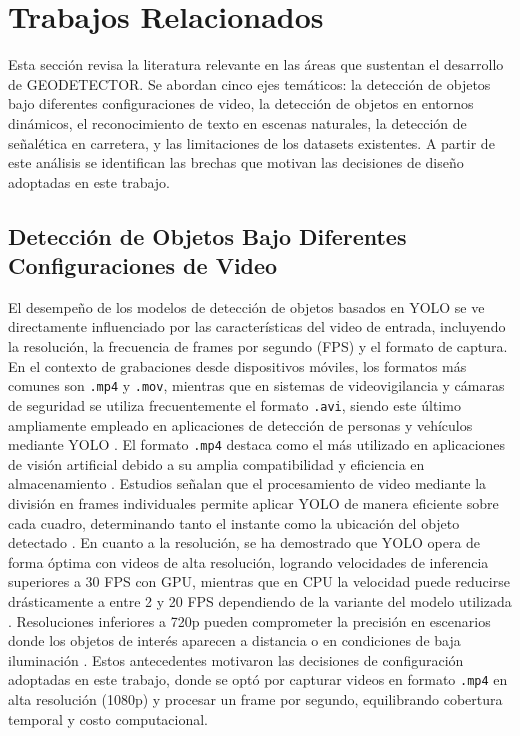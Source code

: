 \documentclass[runningheads]{llncs}
\begin{document}
\section{Trabajos Relacionados}
Esta sección revisa la literatura relevante en las áreas que sustentan el
 desarrollo de GEODETECTOR.
Se abordan cinco ejes temáticos: la detección de objetos bajo diferentes 
configuraciones de video, la detección de objetos en entornos dinámicos, 
el reconocimiento de texto en escenas naturales, 
la detección de señalética en carretera, y las limitaciones de los datasets existentes. A partir de este análisis se identifican las brechas 
que motivan las decisiones de diseño adoptadas en este trabajo.

\subsection{Detección de Objetos Bajo Diferentes Configuraciones de Video}
El desempeño de los modelos de detección de objetos basados en YOLO 
se ve directamente influenciado por las características del video de 
entrada, incluyendo la resolución, la frecuencia de frames por segundo 
(FPS) y el formato de captura. En el contexto de grabaciones desde 
dispositivos móviles, los formatos más comunes son \texttt{.mp4} y 
\texttt{.mov}, mientras que en sistemas de videovigilancia y cámaras 
de seguridad se utiliza frecuentemente el formato \texttt{.avi}, siendo 
este último ampliamente empleado en aplicaciones de detección de 
personas y vehículos mediante YOLO \cite{yolo-mp4-frames}. El formato 
\texttt{.mp4} destaca como el más utilizado en aplicaciones de visión 
artificial debido a su amplia compatibilidad y eficiencia en 
almacenamiento \cite{yolo-mp4-frames}. Estudios señalan que el 
procesamiento de video mediante la división en frames individuales 
permite aplicar YOLO de manera eficiente sobre cada cuadro, 
determinando tanto el instante como la ubicación del objeto detectado 
\cite{yolo-mp4-frames}. En cuanto a la resolución, se ha demostrado 
que YOLO opera de forma óptima con videos de alta resolución, logrando 
velocidades de inferencia superiores a 30 FPS con GPU, mientras que en 
CPU la velocidad puede reducirse drásticamente a entre 2 y 20 FPS 
dependiendo de la variante del modelo utilizada 
\cite{yolo-traffic-resolution}. Resoluciones inferiores a 720p pueden 
comprometer la precisión en escenarios donde los objetos de interés 
aparecen a distancia o en condiciones de baja iluminación 
\cite{yolo-traffic-resolution}. Estos antecedentes motivaron las 
decisiones de configuración adoptadas en este trabajo, donde se optó 
por capturar videos en formato \texttt{.mp4} en alta resolución (1080p)
y procesar un frame por segundo, equilibrando cobertura temporal y costo 
computacional.
\end{document}

